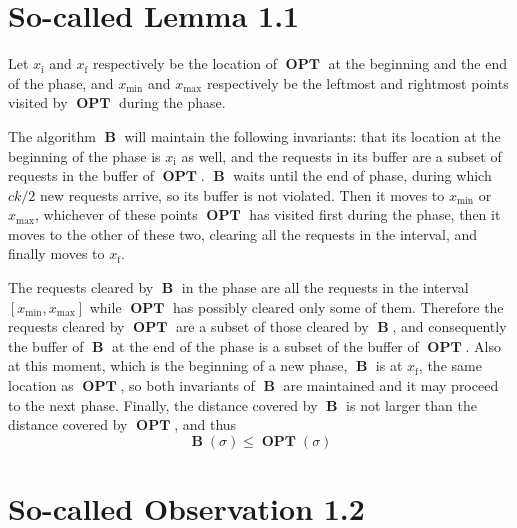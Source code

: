 \documentclass[a4paper]{article}
\DeclareMathOperator \Opt {\textbf{OPT}}
\DeclareMathOperator \Fazowy {\textbf{B}}
\newcommand \opt {\ensuremath{\Opt}}
\newcommand \fazowy {\ensuremath{\Fazowy}}
\begin{document}
\section{So-called Lemma 1.1}

Let $x_\text{i}$ and $x_\text{f}$ respectively be the location of \opt{} at the 
beginning and the end of the phase, and $x_\text{min}$ and $x_\text{max}$ 
respectively be the leftmost and rightmost points visited by \opt{} during the 
phase.

The algorithm \fazowy{} will maintain the following invariants: that its 
location at the beginning of the phase is $x_\text{i}$ as well, and the 
requests in its buffer are a subset of requests in the buffer of \opt. 
\fazowy{} waits until the end of phase, during which $ck/2$ new requests 
arrive, so its buffer is not violated. Then it moves to $x_\text{min}$ or 
$x_\text{max}$, whichever of these points \opt{} has visited first during the 
phase, then it moves to the other of these two, clearing all the requests in 
the interval, and finally moves to $x_\text{f}$.

The requests cleared by \fazowy{} in the phase are all the requests in the 
interval $[x_\text{min},x_\text{max}]$ while \opt{} has possibly cleared only 
some of them.
Therefore the requests cleared by \opt{} are a subset of those cleared by 
\fazowy, and consequently the buffer of \fazowy{} at the end of the phase is a 
subset of the buffer of \opt. Also at this moment, which is the beginning of a 
new phase, \fazowy{} is at $x_\text{f}$, the same location as \opt, so both 
invariants of \fazowy{} are maintained and it may proceed to the next phase. 
Finally, the distance covered by \fazowy{} is not larger than the distance 
covered by \opt{}, and thus
\[ \fazowy(\sigma) \leq \opt(\sigma) \]

\section{So-called Observation 1.2}
\end{document}
